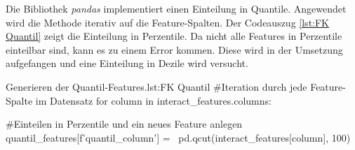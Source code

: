 Die Bibliothek \textit{pandas} implementiert einen Einteilung in Quantile. Angewendet wird die Methode iterativ auf die Feature-Spalten. Der Codeauszug \ref{lst:FK Quantil} zeigt die Einteilung in Perzentile. Da nicht alle Features in Perzentile einteilbar sind, kann es zu einem Error kommen. Diese wird in der Umsetzung aufgefangen und eine Einteilung in Dezile wird versucht. 
        
\begin{pythoncode}{Generieren der Quantil-Features.}{lst:FK Quantil}
#Iteration durch jede Feature-Spalte im Datensatz
for column in interact_features.columns:

    #Einteilen in Perzentile und ein neues Feature anlegen
    quantil_features[f'quantil_{column}'] = \ 
        pd.qcut(interact_features[column], 100)
\end{pythoncode}


